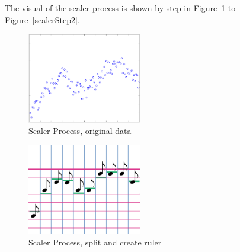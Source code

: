    The visual of the scaler process is shown by step in Figure~\ref{scalerStep0}
   to Figure~\ref{scalerStep2}. 

\begin{figure}[H]
\centering
\newcommand{\widthOfScalerStepFigure}{5cm}
\includegraphics[width=\widthOfScalerStepFigure]{figWR/scaler0}
\caption{Scaler Process, original data}
\label{scalerStep0}
\end{figure}

\begin{figure}[H]
\centering
\newcommand{\widthOfScalerStepFigure}{5cm}
\includegraphics[width=\widthOfScalerStepFigure]{figWR/scaler1}
\caption{Scaler Process, split and create ruler}
\label{scalerStep1}
\end{figure}

